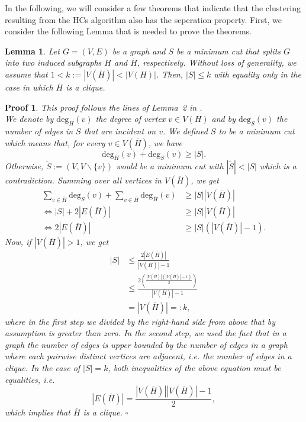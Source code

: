 \documentclass[paper=a4,fontsize=11pt,DIV=8,BCOR=5mm,twoside,pdftex,bibtotocnumbered]{scrreprt}
\newcommand{\degree}{\text{deg}}
\theoremstyle{plain}
\newtheorem{lemma}[proposition]{Lemma}
\newtheorem*{myproof}{Proof}
\newenvironment{pf}{\begin{myproof}}{\hfill$\square$\end{myproof}}
\begin{document}
In the following, we will consider a few theorems that indicate that the clustering resulting from the HCs algorithm also has the seperation property. First, we consider the following Lemma that is needed to prove the theorems.

\begin{lemma}\label{lem:min_cut_clique}
	Let $G=(V,E)$ be a graph and $S$ be a minimum cut that splits $G$ into two induced subgraphs $H$ and $\overline{H}$, respectively. Without loss of generality, we assume that $1 < k := |V(\overline H)| < |V(H)|$. Then, $|S| \le k$ with equality only in the case in which $\overline{H}$ is a clique.
\end{lemma}

\begin{pf}
	This proof follows the lines of Lemma~2 in \cite{Hartuv2000}.\\
	We denote by $\degree_H(v)$ the degree of vertex $v\in V(H)$ and by $\degree_S(v)$ the number of edges in $S$ that are incident on $v$. We defined $S$ to be a minimum cut which means that, for every $v \in V(\overline{H})$, we have 
	\[
	\degree_{\overline{H}}(v) + \degree_S(v) \ge |S|.
	\]
	Otherwise, $\tilde{S}:= (V, V\backslash\{v\})$ would be a minimum cut with $|\tilde{S}| < |S|$ which is a contradiction. Summing over all vertices in $V(\overline{H})$, we get 
	\[
	\begin{aligned}
	\sum_{v\in \overline{H}} \degree_{S}(v) + \sum_{v\in \overline{H}} \degree_{\overline{H}}(v) &\ge |S| |V(\overline H)| \\
	\Longleftrightarrow |S| + 2|E(\overline{H})| &\ge |S| |V(\overline H)| \\
	\Longleftrightarrow 2|E(\overline{H})| &\ge |S| (|V(\overline H)| - 1).
	\end{aligned}
	\] 
	Now, if $|V(\overline H)|>1$, we get
	\[
	\begin{aligned}
	|S| &\le \frac{2|E(\overline{H})|}{|V(\overline H)| - 1} \\
	&\le \frac{2\left(\frac{|V(\overline H)| (|V(\overline H)| - 1)}{2}\right)}{|V(\overline H)| - 1} \\
	&= |V(\overline H)| =: k,
	\end{aligned}
	\]
	where in the first step we divided by the right-hand side from above that by assumption is greater than zero. In the second step, we used the fact that in a graph the number of edges is upper bounded by the number of edges in a graph where each pairwise distinct vertices are adjacent, i.e. the number of edges in a clique.
	In the case of $|S| = k$, both inequalities of the above equation must be equalities, i.e. 
	\[
	|E(\overline{H})| = \frac{|V(\overline H)| |V(\overline H)| - 1}{2},
	\]
	which implies that $\overline H$ is a clique.
\end{pf}
\end{document}
